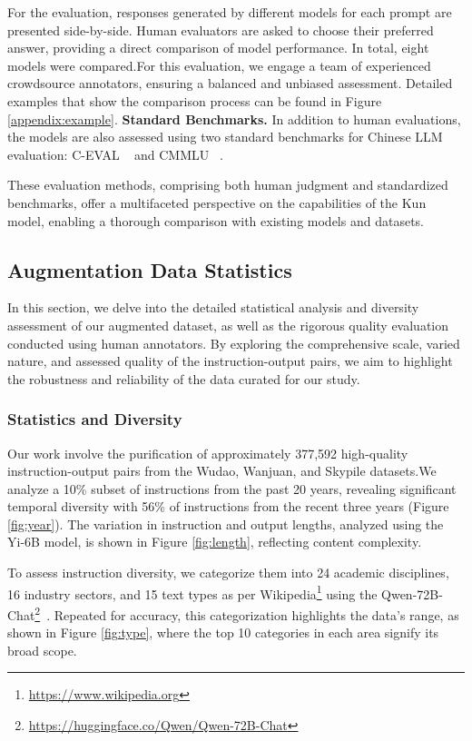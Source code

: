 For the evaluation, responses generated by different models for each prompt are presented side-by-side. Human evaluators are asked to choose their preferred answer, providing a direct comparison of model performance. In total, eight models were compared.For this evaluation, we engage a team of experienced crowdsource annotators, ensuring a balanced and unbiased assessment. Detailed examples that show the comparison process can be found in Figure \ref{appendix:example}.
\noindent
\textbf{Standard Benchmarks.} In addition to human evaluations, the models are also assessed using two standard benchmarks for Chinese LLM evaluation: C-EVAL ~\citep{huang2023ceval} and CMMLU ~\citep{li2023cmmlu}.

These evaluation methods, comprising both human judgment and standardized benchmarks, offer a multifaceted perspective on the capabilities of the Kun model, enabling a thorough comparison with existing models and datasets.

\subsection{Augmentation Data Statistics}

In this section, we delve into the detailed statistical analysis and diversity assessment of our augmented dataset, as well as the rigorous quality evaluation conducted using human annotators. 
By exploring the comprehensive scale, varied nature, and assessed quality of the instruction-output pairs, we aim to highlight the robustness and reliability of the data curated for our study.

\subsubsection{Statistics and Diversity}

Our work involve the purification of approximately 377,592 high-quality instruction-output pairs from the Wudao, Wanjuan, and Skypile datasets.We analyze a 10\% subset of instructions from the past 20 years, revealing significant temporal diversity with 56\% of instructions from the recent three years (Figure \ref{fig:year}). The variation in instruction and output lengths, analyzed using the Yi-6B model, is shown in Figure \ref{fig:length}, reflecting content complexity.

To assess instruction diversity, we categorize them into 24 academic disciplines, 16 industry sectors, and 15 text types as per Wikipedia\footnote{\url{https://www.wikipedia.org}} using the Qwen-72B-Chat\footnote{\url{https://huggingface.co/Qwen/Qwen-72B-Chat}}~\citep{bai2023qwen}. Repeated for accuracy, this categorization highlights the data's range, as shown in Figure \ref{fig:type}, where the top 10 categories in each area signify its broad scope.


